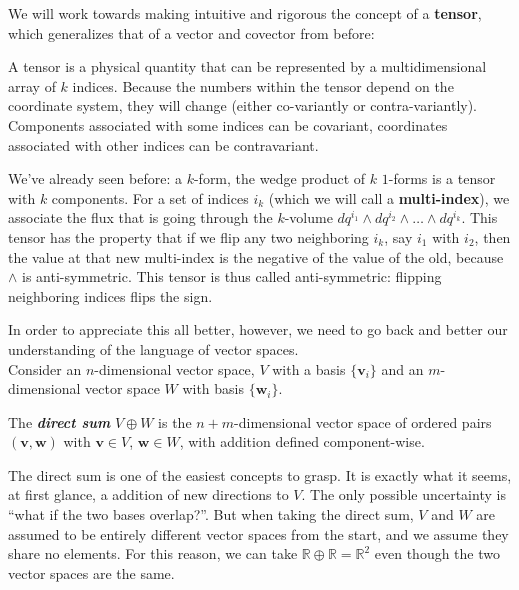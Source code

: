 	We will work towards making intuitive and rigorous the concept of a \textbf{tensor}, which generalizes that of a vector and covector from before:
	\begin{concept}[Tensor]
		A tensor is a physical quantity that can be represented by a multidimensional array of $k$ indices. Because the numbers within the tensor depend on the coordinate system, they will change (either co-variantly or contra-variantly). Components associated with some indices can be covariant, coordinates associated with other indices can be contravariant. 
	\end{concept}
	We've already seen before: a $k$-form, the wedge product of $k$ $1$-forms is a tensor with $k$ components. For a set of indices $i_k$ (which we will call a \textbf{multi-index}), we associate the flux that is going through the $k$-volume $dq^{i_1} \wedge dq^{i_2} \wedge \dots \wedge dq^{i_k}$. This tensor has the property that if we flip any two neighboring $i_k$, say $i_1$ with $i_2$, then the value at that new multi-index is the negative of the value of the old, because $\wedge$ is anti-symmetric. This tensor is thus called anti-symmetric: flipping neighboring indices flips the sign.
	
	In order to appreciate this all better, however, we need to go back and better our understanding of the language of vector spaces. \\
	
	Consider an $n$-dimensional vector space, $V$ with a basis $\{ \mathbf v_i \}$ and an $m$-dimensional vector space $W$ with basis $\{ \mathbf w_i \}$. 
	\begin{defn}
		The \emph{\textbf{direct sum}} $V \oplus W$ is the $n+m$-dimensional vector space of ordered pairs $(\mathbf v, \mathbf w)$ with $\mathbf v \in V$, $\mathbf w \in W$, with addition defined component-wise.
	\end{defn}
	
	
	The direct sum is one of the easiest concepts to grasp. It is exactly what it seems, at first glance, a addition of new directions to $V$. The only possible uncertainty is ``what if the two bases overlap?''. But when taking the direct sum, $V$ and $W$ are assumed to be entirely different vector spaces from the start, and we assume they share no elements. For this reason, we can take $\mathbb{R} \oplus \mathbb{R} = \mathbb{R}^2$ even though the two vector spaces are the same.
	
